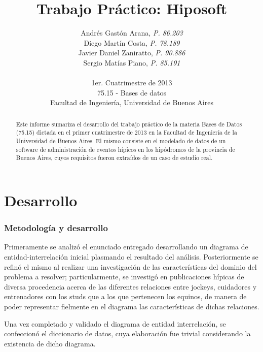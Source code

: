 \documentclass[a4paper,11pt]{article}
\title{\textbf{Trabajo Práctico: Hiposoft}}
\author{
  Andrés Gastón Arana,     \textit{P. 86.203}                      \\
  Diego Martín Costa,      \textit{P. 78.189}                      \\
  Javier Daniel Zaniratto, \textit{P. 90.886}                      \\
  Sergio Matías Piano,     \textit{P. 85.191}                      \\
                                                                   \\
  \normalsize{1er. Cuatrimestre de 2013}                           \\
  \normalsize{75.15 - Bases de datos}                              \\
  \normalsize{Facultad de Ingeniería, Universidad de Buenos Aires}
}
\date{}
\begin{document}
\thispagestyle{empty}
\maketitle

\begin{abstract}

  Este informe sumariza el desarrollo del trabajo práctico de la materia Bases
  de Datos (75.15) dictada en el primer cuatrimestre de 2013 en la Facultad de
  Ingeniería de la Universidad de Buenos Aires. El mismo consiste en el
  modelado de datos de un software de administración de eventos hípicos en los
  hipódromos de la provincia de Buenos Aires, cuyos requisitos fueron extraídos
  de un caso de estudio real.

\end{abstract}

\clearpage

\tableofcontents
\clearpage


\part{Desarrollo}

\section{Metodología y desarrollo}

Primeramente se analizó el enunciado entregado desarrollando un diagrama de
entidad-interrelación inicial plasmando el resultado del análisis.
Posteriormente se refinó el mismo al realizar una investigación de las
características del dominio del problema a resolver; particularmente, se
investigó en publicaciones hípicas de diversa procedencia acerca de las
diferentes relaciones entre jockeys, cuidadores y entrenadores con los studs
que a los que pertenecen los equinos, de manera de poder representar fielmente
en el diagrama las características de dichas relaciones.

Una vez completado y validado el diagrama de entidad interrelación, se
confeccionó el diccionario de datos, cuya elaboración fue trivial considerando
la existencia de dicho diagrama.
\end{document}
